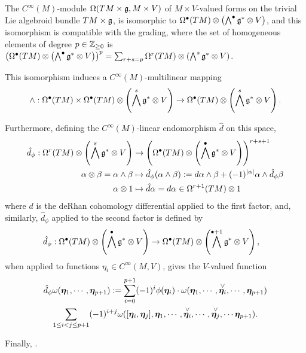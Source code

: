\begin{theorem}
The $C^\infty(M)$-module $\Omega(TM \times \mathfrak{g}, M \times V)$ of $M \times V$-valued forms on the trivial Lie algebroid bundle $TM \times \mathfrak{g}$, is isomorphic to $\Omega^\bullet(TM) \otimes \left(\bigwedge^\bullet \mathfrak{g}^* \otimes V\right)$, and this isomorphism is compatible with the grading, where the set of homogeneous elements of degree $p \in \mathbb{Z}_{\geq 0}$ is $\left( \Omega^\bullet(TM) \otimes \left(\bigwedge^\bullet \mathfrak{g}^* \otimes V\right) \right)^p = \sum_{r + s = p} \Omega^r(TM) \otimes \left(\bigwedge^s \mathfrak{g}^* \otimes V\right)$. 

This isomorphism induces a $C^\infty(M)$-multilinear mapping
\begin{equation}
    \wedge: \Omega^\bullet(TM) \times \Omega^\bullet(TM) \otimes \left(\bigwedge^s \mathfrak{g}^* \otimes V\right)
    \to 
    \Omega^\bullet(TM) \otimes \left(\bigwedge^s \mathfrak{g}^* \otimes V\right).
\end{equation}

Furthermore, defining the $C^\infty(M)$-linear endomorphism $\hat d$ on this space, 
\begin{align}
    \hat d_\phi: \Omega^r(TM) \otimes \left(\bigwedge^s \alg g^* \otimes V\right) &\to \left( \Omega^\bullet(TM) \otimes \left(\bigwedge^\bullet \alg g^* \otimes V\right)\right)^{r+s+1} \\
    \alpha \otimes \beta = \alpha \wedge \beta &\mapsto  \hat d_\phi (\alpha \wedge \beta) := d\alpha \wedge \beta + (-1)^{|\alpha|} \alpha \wedge \hat d_{\phi} \beta \\
    \alpha \otimes 1 &\mapsto \hat d\alpha = d\alpha \in \Omega^{r+1}(TM) \otimes 1 
\end{align}
where $d$ is the deRhan cohomology differential applied to the first factor, and, similarly, $\hat d_\phi$ applied to the second factor is defined by
\begin{align*}
    \hat d_\phi: \Omega^\bullet(TM) \otimes \left(\bigwedge^\bullet \alg g^* \otimes V\right) &\to \Omega^\bullet(TM) \otimes \left(\bigwedge^{\bullet+1} \alg g^* \otimes V\right),
\end{align*} when applied to functions $\eta_i \in C^\infty(M, V)$, gives the $V$-valued function
\begin{multline}
    \hat d_\phi\omega(\sect \eta_1, \cdots, \sect \eta_{p+1}) := \sum_{i = 0}^{p+1} (-1)^i \phi(\sect \eta_i) \cdot \omega(\sect \eta_1, \cdots, \overset{\vee}{\sect \eta_i}, \cdots, \sect \eta_{p+1}) \\
    \sum_{1 \leq i < j \leq p+1} (-1)^{i+j} \omega([\sect \eta_i, \sect \eta_j], \sect \eta_1, \cdots, \overset{\vee}{\sect \eta_i}, \cdots, \overset{\vee}{\sect \eta_j}, \cdots \sect \eta_{p+1}).
\end{multline}

Finally, .
\end{theorem}


